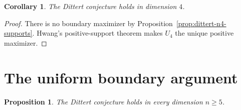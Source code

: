 \documentclass[10pt,a4paper]{amsart}
\newtheorem{proposition}[theorem]{Proposition}
\newtheorem{corollary}[theorem]{Corollary}
\theoremstyle{definition}
\theoremstyle{remark}
\begin{document}
\begin{corollary}
The Dittert conjecture holds in dimension \(4\).
\end{corollary}

\begin{proof}
There is no boundary maximizer by
Proposition~\ref{prop:dittert-n4-supports}. Hwang's positive-support theorem
makes \(U_4\) the unique positive maximizer.
\end{proof}

\section{The uniform boundary argument}\label{sec:uniform}

\begin{proposition}\label{prop:dittert-nge5}
The Dittert conjecture holds in every dimension \(n\geq5\).
\end{proposition}
\end{document}
